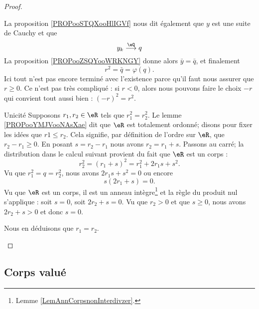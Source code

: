 \begin{proof}
\begin{subproof}
            La proposition \ref{PROPooSTQXooHlIGVf} nous dit également que \( y\) est une suite de Cauchy et que
            \begin{equation}
                y_k\stackrel{\eQ}{\longrightarrow}q
            \end{equation}
            La proposition \ref{PROPooZSQYooWRKNGY} donne alors \( \bar y=\bar q\), et finalement
            \begin{equation}
                r^2=\bar q=\varphi(q).
            \end{equation}
            Ici tout n'est pas encore terminé avec l'existence parce qu'il faut nous assurer que \( r\geq 0\). Ce n'est pas très compliqué : si \( r<0\), alors nous pouvons faire le choix \( -r\) qui convient tout aussi bien : \( (-r)^2=r^2\).
        \item[Unicité]
            Supposons \( r_1,r_2\in \eR\) tels que \( r_1^2=r_2^2\). Le lemme \ref{PROPooYMJVooNAsXae} dit que \( \eR\) est totalement ordonné; disons pour fixer les idées que \( r1\leq r_2\). Cela signifie, par définition de l'ordre sur \( \eR\), que \( r_2-r_1\geq 0\). En posant \( s=r_2-r_1\) nous avons \( r_2=r_1+s\). Passons au carré; la distribution dans le calcul suivant provient du fait que \( \eR\) est un corps :
            \begin{equation}
                r_2^2=(r_1+s)^2=r_1^2+2r_1s+s^2.
            \end{equation}
            Vu que \( r_1^2=q=r_2^2\), nous avons \( 2r_1s+s^2=0\) ou encore
            \begin{equation}
                s(2r_1+s)=0.
            \end{equation}
            Vu que \( \eR\) est un corps, il est un anneau intègre\footnote{Lemme \ref{LemAnnCorpsnonInterdivzer}.} et la règle du produit nul s'applique : soit \( s=0\), soit \( 2r_2+s=0\). Vu que \( r_2>0\) et que \( s\geq 0\), nous avons \( 2r_2+s>0\) et donc \( s=0\). 

            Nous en déduisons que \( r_1=r_2\).
    \end{subproof}
\end{proof}


\subsection{Corps valué}

